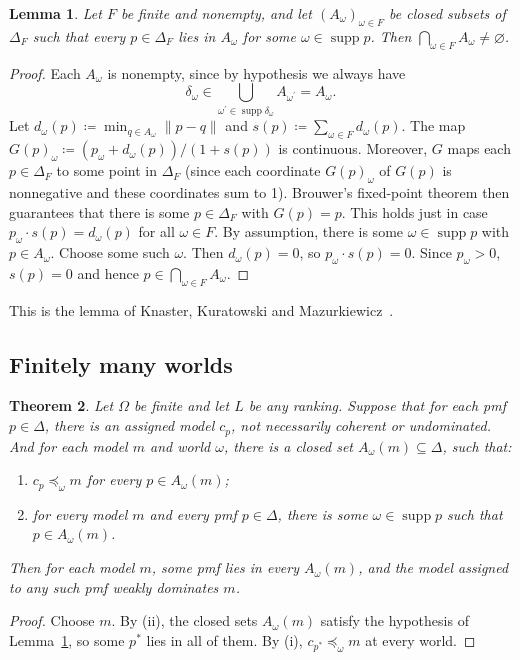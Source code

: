 \documentclass[11pt]{article}
\newtheorem{theorem}{Theorem}[section]
\newtheorem{lemma}[theorem]{Lemma}
\theoremstyle{definition}
\newcommand{\supp}{\operatorname{supp}}
\begin{document}
\begin{lemma}\label{lem:kkm}
Let $F$ be finite and nonempty, and let $(A_\omega)_{\omega\in F}$ be closed subsets of $\Delta_F$ such that every $p\in\Delta_F$ lies in $A_\omega$ for some $\omega\in\supp p$. Then $\bigcap_{\omega\in F}A_\omega\ne\varnothing$.
\end{lemma}
\begin{proof}
Each $A_\omega$ is nonempty, since by hypothesis we always have 
\[
\delta_\omega\in\bigcup_{\omega^\prime\in\supp \delta_\omega}A_{\omega^\prime}=A_\omega.
\]
Let $d_\omega(p)\coloneqq\min_{q\in A_\omega}\lVert p-q \rVert$ and $s(p)\coloneqq\sum_{\omega\in F} d_\omega(p)$. The map $G(p)_\omega\coloneqq(p_\omega+d_\omega(p))/(1+s(p))$ is continuous. Moreover, $G$ maps each $p\in\Delta_F$ to some point in $\Delta_F$ (since each coordinate $G(p)_\omega$ of $G(p)$ is nonnegative and these coordinates sum to 1). Brouwer's fixed-point theorem then guarantees that there is some $p\in\Delta_F$ with $G(p)=p$. This holds just in case $p_\omega\cdot s(p)=d_\omega(p)$ for all $\omega\in F$. By assumption, there is some $\omega\in\supp p$ with $p\in A_\omega$. Choose some such $\omega$. Then $d_\omega(p)=0$, so $p_\omega\cdot s(p)=0$. Since $p_\omega>0$, $s(p)=0$ and hence $p\in\bigcap_{\omega\in F}A_\omega$.
\end{proof}

This is the lemma of Knaster, Kuratowski and Mazurkiewicz~\cite{KKM1929}.




\subsection{Finitely many worlds}
\begin{theorem}\label{thm:finite}
Let $\Omega$ be finite and let $L$ be any ranking. Suppose that for each pmf $p\in\Delta$, there is an assigned model $c_p$, not necessarily coherent or undominated. And for each model $m$ and world $\omega$, there is a closed set $A_\omega(m)\subseteq\Delta$, such that:
\begin{enumerate}[label=(\roman*)]
\item $c_p\preceq_\omega m$ for every $p\in A_\omega(m)$;
\item for every model $m$ and every pmf $p\in\Delta$, there is some $\omega\in\supp p$ such that $p\in A_\omega(m)$.
\end{enumerate}
Then for each model $m$, some pmf lies in every $A_\omega(m)$, and the model assigned to any such pmf weakly dominates $m$.
\end{theorem}
\begin{proof}
Choose $m$. By (ii), the closed sets $A_\omega(m)$ satisfy the hypothesis of Lemma~\ref{lem:kkm}, so some $p^*$ lies in all of them. By (i), $c_{p^*}\preceq_\omega m$ at every world.
\end{proof}
\end{document}
